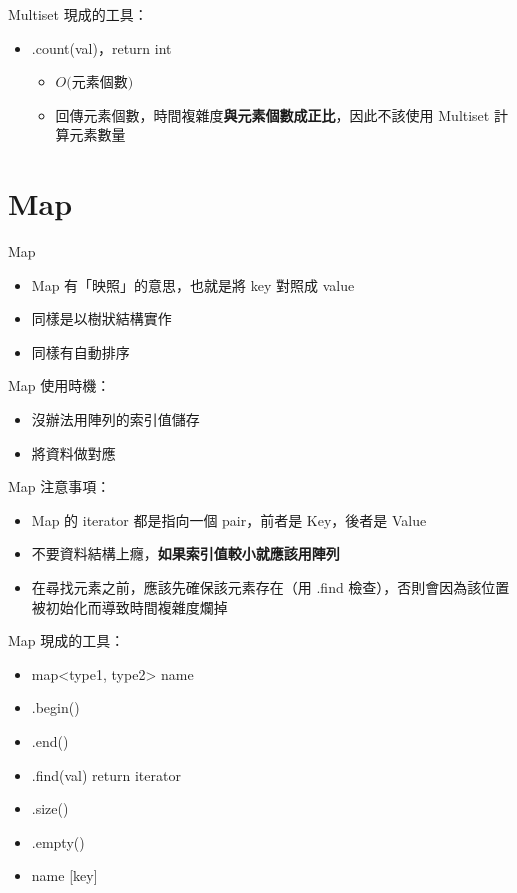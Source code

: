 \documentclass[mathserif]{beamer}
\begin{document}
\begin{frame}{Multiset}
    現成的工具：
    \begin{itemize}
        \item .count({\color{red}val})，return int
        \begin{itemize}
            \item $O($元素個數$)$
            \item 回傳元素個數，時間複雜度\textbf{與元素個數成正比}，因此不該使用 Multiset 計算元素數量
        \end{itemize}
    \end{itemize}
\end{frame}

\section{Map}

\begin{frame}{Map}
    \begin{itemize}
        \item Map 有「映照」的意思，也就是將 key 對照成 value
        \item 同樣是以樹狀結構實作
        \item 同樣有自動排序
    \end{itemize}
\end{frame}

\begin{frame}{Map}
    使用時機：
    \begin{itemize}
        \item 沒辦法用陣列的索引值儲存
        \item 將資料做對應
    \end{itemize}
\end{frame}

\begin{frame}{Map}
    注意事項：
    \begin{itemize}
        \item Map 的 iterator 都是指向一個 pair，前者是 Key，後者是 Value
        \item 不要資料結構上癮，\textbf{如果索引值較小就應該用陣列}
        \item 在尋找元素之前，應該先確保該元素存在（用 .find 檢查），否則會因為該位置被初始化而導致時間複雜度爛掉
    \end{itemize}
\end{frame}

\begin{frame}{Map}
    現成的工具：
    \begin{itemize}
        \item map<{\color{red}type1}, {\color{red}type2}> {\color{red}name}
        \item .begin()
        \item .end()
        \item .find({\color{red}val}) return iterator
        \item .size()
        \item .empty()
        \item {\color{red}name} [{\color{red}key}]
    \end{itemize}
\end{frame}
\end{document}
